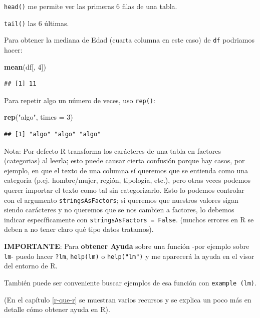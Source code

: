 \documentclass[]{book}
\newenvironment{Shaded}{\begin{snugshade}}{\end{snugshade}}
\newcommand{\DataTypeTok}[1]{\textcolor[rgb]{0.13,0.29,0.53}{#1}}
\newcommand{\DecValTok}[1]{\textcolor[rgb]{0.00,0.00,0.81}{#1}}
\newcommand{\KeywordTok}[1]{\textcolor[rgb]{0.13,0.29,0.53}{\textbf{#1}}}
\newcommand{\NormalTok}[1]{#1}
\newcommand{\StringTok}[1]{\textcolor[rgb]{0.31,0.60,0.02}{#1}}
\theoremstyle{definition}
\theoremstyle{definition}
\theoremstyle{definition}
\theoremstyle{remark}
\begin{document}
\texttt{head()} me permite ver las primeras 6 filas de una tabla.

\texttt{tail()} las 6 últimas.

Para obtener la mediana de Edad (cuarta columna en este caso) de
\texttt{df} podriamos hacer:

\begin{Shaded}
\begin{Highlighting}[]
\KeywordTok{mean}\NormalTok{(df[, }\DecValTok{4}\NormalTok{])}
\end{Highlighting}
\end{Shaded}

\begin{verbatim}
## [1] 11
\end{verbatim}

Para repetir algo un número de veces, uso \texttt{rep()}:

\begin{Shaded}
\begin{Highlighting}[]
\KeywordTok{rep}\NormalTok{(}\StringTok{"algo"}\NormalTok{, }\DataTypeTok{times =} \DecValTok{3}\NormalTok{)}
\end{Highlighting}
\end{Shaded}

\begin{verbatim}
## [1] "algo" "algo" "algo"
\end{verbatim}

Nota: Por defecto R transforma los carácteres de una tabla en factores
(categorias) al leerla; esto puede causar cierta confusión porque hay
casos, por ejemplo, en que el texto de una columna sí queremos que se
entienda como una categoria (p.ej. hombre/mujer, región, tipología,
etc.), pero otras veces podemos querer importar el texto como tal sin
categorizarlo. Esto lo podemos controlar con el argumento
\texttt{stringsAsFactors}; si queremos que nuestros valores sigan siendo
carácteres y no queremos que se nos cambien a factores, lo debemos
indicar específicamente con \texttt{stringsAsFactors\ =\ False}. (muchos
errores en R se deben a no tener claro qué tipo datos tratamos).

 \textbf{IMPORTANTE}: Para \textbf{obtener Ayuda} sobre una función -por
ejemplo sobre \texttt{lm}- puedo hacer \texttt{?lm}, \texttt{help(lm)} o
\texttt{help("lm")} y me aparecerá la ayuda en el visor del entorno de
R.

También puede ser conveniente buscar ejemplos de esa función con
\texttt{example\ (lm)}.

(En el capítulo \ref{r-que-r} se muestran varios recursos y se explica
un poco más en detalle cómo obtener ayuda en R).
\end{document}
